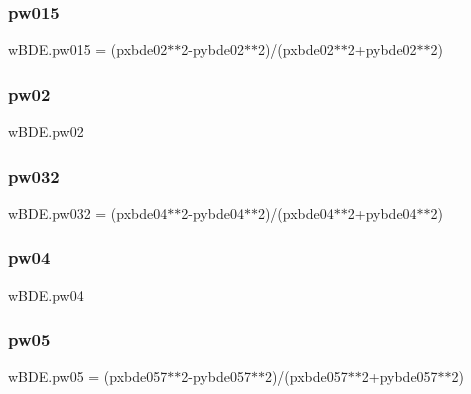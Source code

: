 \subsubsection{\texorpdfstring{pw015}{pw015}}
{\footnotesize\ttfamily w\+B\+D\+E.\+pw015 = (pxbde02$\ast$$\ast$2-\/pybde02$\ast$$\ast$2)/(pxbde02$\ast$$\ast$2+pybde02$\ast$$\ast$2)}

\mbox{\label{namespacewBDE_a349ea9d0091a1e0e0c1a32eead43ee85}} 
\subsubsection{\texorpdfstring{pw02}{pw02}}
{\footnotesize\ttfamily w\+B\+D\+E.\+pw02}

\mbox{\label{namespacewBDE_a3b7c6e6fe2c38a680372baca5289bd08}} 
\subsubsection{\texorpdfstring{pw032}{pw032}}
{\footnotesize\ttfamily w\+B\+D\+E.\+pw032 = (pxbde04$\ast$$\ast$2-\/pybde04$\ast$$\ast$2)/(pxbde04$\ast$$\ast$2+pybde04$\ast$$\ast$2)}

\mbox{\label{namespacewBDE_a68e42f8ad69614fbe52fe8e56130a334}} 
\subsubsection{\texorpdfstring{pw04}{pw04}}
{\footnotesize\ttfamily w\+B\+D\+E.\+pw04}

\mbox{\label{namespacewBDE_ab2d775042ac54c655767b2e1ba519dd8}} 
\subsubsection{\texorpdfstring{pw05}{pw05}}
{\footnotesize\ttfamily w\+B\+D\+E.\+pw05 = (pxbde057$\ast$$\ast$2-\/pybde057$\ast$$\ast$2)/(pxbde057$\ast$$\ast$2+pybde057$\ast$$\ast$2)}

\mbox{\label{namespacewBDE_a50eb888b1c78670796840f459e078b31}} 
